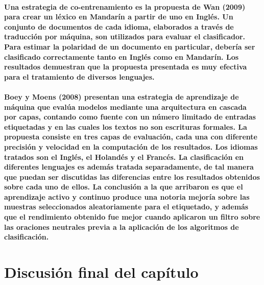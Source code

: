 \paragraph{Una estrategia de co-entrenamiento es la propuesta de Wan (2009) para crear un l\'exico en Mandar\'in a partir de uno en Ingl\'es. Un conjunto de documentos de cada idioma, elaborados a trav\'es de traducci\'on por m\'aquina, son utilizados para evaluar el clasificador. Para estimar la polaridad de un documento en particular, deber\'ia ser clasificado correctamente tanto en Ingl\'es como en Mandar\'in. Los resultados demuestran que la propuesta presentada es muy efectiva para el tratamiento de diversos lenguajes.}

\paragraph{Boey y Moens (2008) presentan una estrategia de aprendizaje de m\'aquina que eval\'ua modelos mediante una arquitectura en cascada por capas, contando como fuente con un n\'umero limitado de entradas etiquetadas y en las cuales los textos no son escrituras formales. La propuesta consiste en tres capas de evaluaci\'on, cada una con diferente precisi\'on y velocidad en la computaci\'on de los resultados. Los idiomas tratados son el Ingl\'es, el Holand\'es y el Franc\'es. La clasificaci\'on en diferentes lenguajes es adem\'as tratada separadamente, de tal manera que puedan ser discutidas las diferencias entre los resultados obtenidos sobre cada uno de ellos. La conclusi\'on a la que arribaron es que el aprendizaje activo y continuo produce una notoria mejor\'ia sobre las muestras seleccionados aleatoriamente para el etiquetado, y adem\'as que el rendimiento obtenido fue mejor cuando aplicaron un filtro sobre las oraciones neutrales previa a la aplicaci\'on de los algoritmos de clasificaci\'on.}

\paragraph{} 

\section{Discusi\'on final del cap\'itulo}
